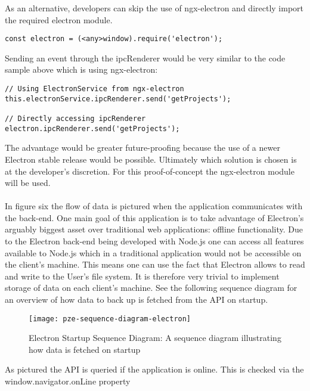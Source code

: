 As an alternative, developers can skip the use of ngx-electron and directly import the required electron module.
\begin{lstlisting}
const electron = (<any>window).require('electron');
\end{lstlisting}
Sending an event through the ipcRenderer would be very similar to the code sample above which is using 
ngx-electron:
\begin{lstlisting}
// Using ElectronService from ngx-electron
this.electronService.ipcRenderer.send('getProjects');

// Directly accessing ipcRenderer
electron.ipcRenderer.send('getProjects');
\end{lstlisting}
The advantage would be greater future-proofing because the use of a newer Electron stable release would
be possible.
Ultimately which solution is chosen is at the developer's discretion. 
For this proof-of-concept the ngx-electron module will be used.\paragraph{}
In figure six the flow of data is pictured when the application communicates with
the back-end.
One main goal of this application is to take advantage of Electron's arguably biggest asset over 
traditional web applications: offline functionality.
Due to the Electron back-end being developed with Node.js one can access all features available to Node.js 
which in a traditional application would not be accessible on the client's machine.
This means one can use the fact that Electron allows to read and write to the User's file system. 
It is therefore very trivial to implement storage of data on each client's machine.  
See the following sequence diagram for an overview of how data to back up is fetched from the API 
on startup.
\begin{figure}[H]
  \centering
  \label{fig:pze-sequence-diagram-electron}
  \caption{Electron Startup Sequence Diagram:
  A sequence diagram illustrating how data is fetched on startup}
  \texttt{[image: pze-sequence-diagram-electron]}
\end{figure}
As pictured the API is queried if the application is online.
This is checked via the window.navigator.onLine property 